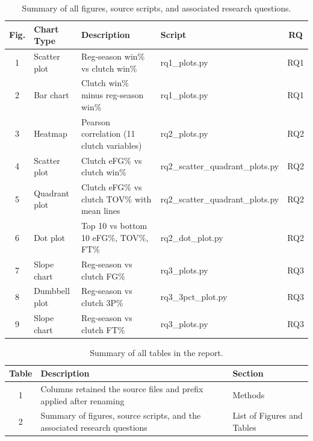 \documentclass[12pt]{article}
\begin{document}
\begin{table}[ht]
    \centering
    \caption{Summary of all figures, source scripts, and associated research questions.}
    \label{tab:figures}
    \renewcommand{\arraystretch}{1.4}
    \small
    \begin{tabular}{@{} c l p{5.5cm} l c @{}}
        \toprule
        \textbf{Fig.} & \textbf{Chart Type} & \textbf{Description} & \textbf{Script} & \textbf{RQ} \\
        \midrule
        1 & Scatter plot   & Reg-season win\% vs clutch win\%                        & rq1\_plots.py                        & RQ1 \\
        2 & Bar chart      & Clutch win\% minus reg-season win\%                     & rq1\_plots.py                        & RQ1 \\
        3 & Heatmap        & Pearson correlation (11 clutch variables)              & rq2\_plots.py                        & RQ2 \\
        4 & Scatter plot   & Clutch eFG\% vs clutch win\%                            & rq2\_scatter\_quadrant\_plots.py     & RQ2 \\
        5 & Quadrant plot  & Clutch eFG\% vs clutch TOV\% with mean lines            & rq2\_scatter\_quadrant\_plots.py     & RQ2 \\
        6 & Dot plot       & Top 10 vs bottom 10 eFG\%, TOV\%, FT\%             & rq2\_dot\_plot.py                    & RQ2 \\
        7 & Slope chart    & Reg-season vs clutch FG\%                     & rq3\_plots.py                        & RQ3 \\
        8 & Dumbbell plot  & Reg-season vs clutch 3P\%                     & rq3\_3pct\_plot.py                   & RQ3 \\
        9 & Slope chart    & Reg-season vs clutch FT\%                     & rq3\_plots.py                        & RQ3 \\
        \bottomrule
    \end{tabular}
\end{table}

\begin{table}[ht]
    \centering
    \caption{Summary of all tables in the report.}
    \label{tab:tables}
    \renewcommand{\arraystretch}{1.4}
    \small
    \begin{tabular}{@{} c p{7cm} l @{}}
        \toprule
        \textbf{Table} & \textbf{Description} & \textbf{Section} \\
        \midrule
        1 & Columns retained the source files and prefix applied after renaming & Methods \\
        2 & Summary of figures, source scripts, and the associated research questions & List of Figures and Tables \\
        \bottomrule
    \end{tabular}
\end{table}
\end{document}
